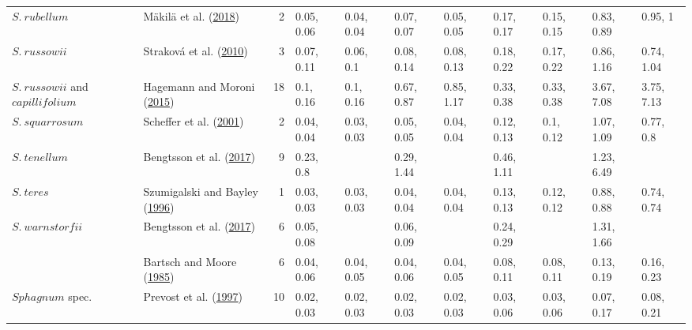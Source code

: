 \documentclass[
  12pt,
]{article}
\begin{document}
\begin{table}[H]
{\begin{tabular}[t]{llrllllllll}
\multirow[t]{-2}{*}{\raggedright\arraybackslash $S.~rubellum$} & Mäkilä et al. (\protect\hyperlink{ref-Makila.2018}{2018}) & 2 & 0.05, 0.06 & 0.04, 0.04 & 0.07, 0.07 & 0.05, 0.05 & 0.17, 0.17 & 0.15, 0.15 & 0.83, 0.89 & 0.95, 1\\
\cmidrule{1-11}
$S.~russowii$ & Straková et al. (\protect\hyperlink{ref-Strakova.2010}{2010}) & 3 & 0.07, 0.11 & 0.06, 0.1 & 0.08, 0.14 & 0.08, 0.13 & 0.18, 0.22 & 0.17, 0.22 & 0.86, 1.16 & 0.74, 1.04\\
\cmidrule{1-11}
$S.~russowii$ and $capillifolium$ & Hagemann and Moroni (\protect\hyperlink{ref-Hagemann.2015}{2015}) & 18 & 0.1, 0.16 & 0.1, 0.16 & 0.67, 0.87 & 0.85, 1.17 & 0.33, 0.38 & 0.33, 0.38 & 3.67, 7.08 & 3.75, 7.13\\
\cmidrule{1-11}
$S.~squarrosum$ & Scheffer et al. (\protect\hyperlink{ref-Scheffer.2001}{2001}) & 2 & 0.04, 0.04 & 0.03, 0.03 & 0.05, 0.05 & 0.04, 0.04 & 0.12, 0.13 & 0.1, 0.12 & 1.07, 1.09 & 0.77, 0.8\\
\cmidrule{1-11}
$S.~tenellum$ & Bengtsson et al. (\protect\hyperlink{ref-Bengtsson.2017}{2017}) & 9 & 0.23, 0.8 &  & 0.29, 1.44 &  & 0.46, 1.11 &  & 1.23, 6.49 & \\
\cmidrule{1-11}
$S.~teres$ & Szumigalski and Bayley (\protect\hyperlink{ref-Szumigalski.1996}{1996}) & 1 & 0.03, 0.03 & 0.03, 0.03 & 0.04, 0.04 & 0.04, 0.04 & 0.13, 0.13 & 0.12, 0.12 & 0.88, 0.88 & 0.74, 0.74\\
\cmidrule{1-11}
$S.~warnstorfii$ & Bengtsson et al. (\protect\hyperlink{ref-Bengtsson.2017}{2017}) & 6 & 0.05, 0.08 &  & 0.06, 0.09 &  & 0.24, 0.29 &  & 1.31, 1.66 & \\
\cmidrule{1-11}
 & Bartsch and Moore (\protect\hyperlink{ref-Bartsch.1985}{1985}) & 6 & 0.04, 0.06 & 0.04, 0.05 & 0.04, 0.06 & 0.04, 0.05 & 0.08, 0.11 & 0.08, 0.11 & 0.13, 0.19 & 0.16, 0.23\\

\multirow[t]{-2}{*}{\raggedright\arraybackslash $Sphagnum$ spec.} & Prevost et al. (\protect\hyperlink{ref-Prevost.1997}{1997}) & 10 & 0.02, 0.03 & 0.02, 0.03 & 0.02, 0.03 & 0.02, 0.03 & 0.03, 0.06 & 0.03, 0.06 & 0.07, 0.17 & 0.08, 0.21\\
\bottomrule
\end{tabular}}
\end{table}
\end{document}
